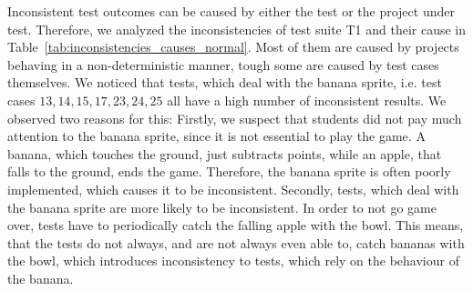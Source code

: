 Inconsistent test outcomes can be caused by either the test or the project under test.
Therefore, we analyzed the inconsistencies of test suite T1 and their cause in Table~\ref{tab:inconsistencies_causes_normal}.
Most of them are caused by projects behaving in a non-deterministic manner,
tough some are caused by test cases themselves.
We noticed that tests, which deal with the banana sprite, i.e. test cases $13, 14, 15, 17, 23, 24, 25$ all have a high number of inconsistent results.
We observed two reasons for this:
Firstly, we suspect that students did not pay much attention to the banana sprite, since it is not essential to play the game.
A banana, which touches the ground, just subtracts points, while an apple, that falls to the ground, ends the game.
Therefore, the banana sprite is often poorly implemented, which causes it to be inconsistent.
Secondly, tests, which deal with the banana sprite are more likely to be inconsistent.
In order to not go game over, tests have to periodically catch the falling apple with the bowl.
This means, that the tests do not always, and are not always even able to, catch bananas with the bowl,
which introduces inconsistency to tests, which rely on the behaviour of the banana.
\parspace

